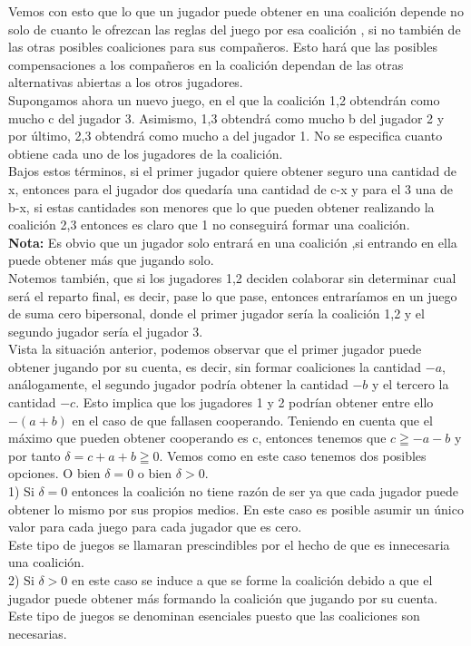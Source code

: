 \documentclass[10pt,a4paper]{book}
\begin{document}
Vemos con esto que lo que un jugador puede obtener en una coalición depende no solo de cuanto le ofrezcan las reglas del juego por esa coalición , si no también de las otras posibles coaliciones para sus compañeros. Esto hará que las posibles compensaciones a los compañeros en la coalición dependan de las otras alternativas abiertas a los otros jugadores.\\

Supongamos ahora un nuevo juego, en el que la coalición 1,2 obtendrán como mucho c del jugador 3. Asimismo, 1,3 obtendrá como mucho b del jugador 2 y por último, 2,3 obtendrá como mucho a del jugador 1. No se especifica cuanto obtiene cada uno de los jugadores de la coalición.\\ 
Bajos estos términos, si el primer jugador quiere obtener seguro una cantidad de x, entonces para el jugador dos quedaría una cantidad de c-x y para el 3 una de b-x, si estas cantidades son menores que lo que pueden obtener realizando la coalición 2,3 entonces es claro que 1 no conseguirá formar una coalición.\\

\textbf{Nota:} Es obvio que un jugador solo entrará en una coalición ,si entrando en ella puede obtener más que jugando solo.\\

Notemos también, que si los jugadores 1,2 deciden colaborar sin determinar cual será el reparto final, es decir, pase lo que pase, entonces entraríamos en un juego de suma cero bipersonal, donde el primer jugador sería la coalición 1,2 y el segundo jugador sería el jugador 3.\\

Vista la situación anterior, podemos observar que el primer jugador puede obtener jugando por su cuenta, es decir, sin formar coaliciones la cantidad $-a$, análogamente, el segundo jugador podría obtener la cantidad $-b$ y el tercero la cantidad $-c$. Esto implica que los jugadores 1 y 2 podrían obtener entre ello $-(a+b)$ en el caso de que fallasen cooperando. Teniendo en cuenta que el máximo que pueden obtener cooperando es c, entonces tenemos que $c \geqq -a -b $ y por tanto $\delta= c + a + b \geqq 0$. Vemos como en este caso tenemos dos posibles opciones. O bien $\delta =0$ o bien $\delta > 0 $. \\
1) Si $\delta=0$ entonces la coalición no tiene razón de ser ya que cada jugador puede obtener lo mismo por sus propios medios. En este caso es posible asumir un único valor para cada juego para cada jugador que es cero. \\
Este tipo de juegos se llamaran prescindibles por el hecho de que es innecesaria una coalición.\\
2) Si $\delta >0$ en este caso se induce a que se forme la coalición debido a que el jugador puede obtener más formando la coalición que jugando por su cuenta.\\
Este tipo de juegos se denominan esenciales puesto que las coaliciones son necesarias.\\
\end{document}
